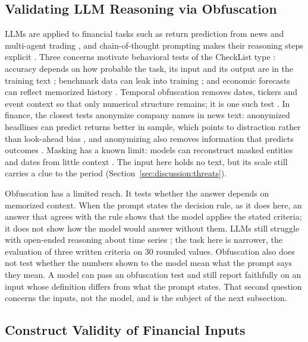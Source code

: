 \subsection{Validating LLM Reasoning via Obfuscation}
\label{sec:background:validation}

LLMs are applied to financial tasks such as return prediction from news \cite{lopez2023can} and multi-agent trading \cite{xiao2024tradingagents}, and chain-of-thought prompting makes their reasoning steps explicit \cite{wei2022chain,kojima2022large}. Three concerns motivate behavioral tests of the CheckList type \cite{ribeiro2020beyond}: accuracy depends on how probable the task, its input and its output are in the training text \cite{mccoy2023embers}; benchmark data can leak into training \cite{dong2024generalization}; and economic forecasts can reflect memorized history \cite{lopezlira2025memorization}. Temporal obfuscation removes dates, tickers and event context so that only numerical structure remains; it is one such test \cite{regan2025obfuscation}. In finance, the closest tests anonymize company names in news text: anonymized headlines can predict returns better in sample, which points to distraction rather than look-ahead bias \cite{glasserman2024lookahead}, and anonymizing also removes information that predicts outcomes \cite{wu2025anonymization}. Masking has a known limit: models can reconstruct masked entities and dates from little context \cite{lopezlira2025memorization}. The input here holds no text, but its scale still carries a clue to the period (Section~\ref{sec:discussion:threats}).

Obfuscation has a limited reach. It tests whether the answer depends on memorized context. When the prompt states the decision rule, as it does here, an answer that agrees with the rule shows that the model applies the stated criteria; it does not show how the model would answer without them. LLMs still struggle with open-ended reasoning about time series \cite{merrill2024timeseries}; the task here is narrower, the evaluation of three written criteria on 30 rounded values. Obfuscation also does not test whether the numbers shown to the model mean what the prompt says they mean. A model can pass an obfuscation test and still report faithfully on an input whose definition differs from what the prompt states. That second question concerns the inputs, not the model, and is the subject of the next subsection.

\subsection{Construct Validity of Financial Inputs}
\label{sec:background:construct}

